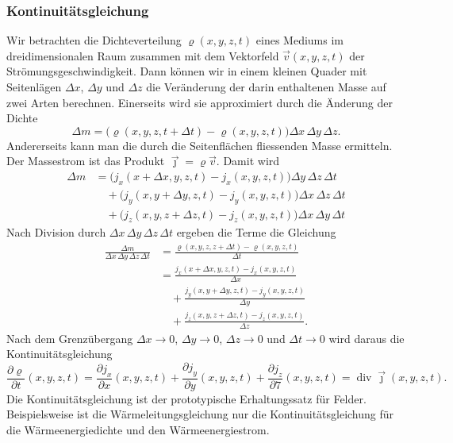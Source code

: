 \subsubsection{Kontinuitätsgleichung}
Wir betrachten die Dichteverteilung $\varrho(x,y,z,t)$ eines Mediums
im dreidimensionalen Raum zusammen mit dem Vektorfeld $\vec{v}(x,y,z,t)$
der Strömungsgeschwindigkeit.
Dann können wir in einem kleinen Quader mit Seitenlägen
$\Delta x$,
$\Delta y$
und
$\Delta z$
die Veränderung der darin enthaltenen Masse auf zwei Arten berechnen.
Einerseits wird sie approximiert durch die Änderung der Dichte
\[
\Delta m
=
\bigl(\varrho(x,y,z,t+\Delta t)-\varrho(x,y,z,t)\bigr)
\Delta x
\,
\Delta y
\,
\Delta z.
\]
Andererseits kann man die durch die Seitenflächen fliessenden Masse
ermitteln.
Der Massestrom ist das Produkt $\vec{\jmath}=\varrho\vec{v}$.
Damit wird
\begin{align*}
\Delta m
&=
\bigl(
j_x(x+\Delta x,y,z,t)
-
j_x(x,y,z,t)
\bigr)
\Delta y\,\Delta z \, \Delta t
\\
&\quad
+
\bigl(
j_y(x,y+\Delta y,z,t)
-
j_y(x,y,z,t)
\bigr)
\Delta x\,\Delta z \, \Delta t
\\
&\quad
+
\bigl(
j_z(x,y,z+\Delta z,t)
-
j_z(x,y,z,t)
\bigr)
\Delta x\,\Delta y \, \Delta t
\end{align*}
Nach Division durch $\Delta x\, \Delta y\, \Delta z\,\Delta t$ ergeben
die Terme die Gleichung
\begin{align*}
\frac{\Delta m}{\Delta x\,\Delta y\,\Delta z\,\Delta t}
&=
\frac{\varrho(x,y,z,z+\Delta t)-\varrho(x,y,z,t)}{\Delta t}
\\
&=
\frac{
j_x(x+\Delta x,y,z,t)
-
j_x(x,y,z,t)
}{
\Delta x
}
\\
&\quad
+
\frac{
j_y(x,y+\Delta y,z,t)
-
j_y(x,y,z,t)
}{
\Delta y
}
\\
&\quad
+
\frac{
j_z(x,y,z+\Delta z,t)
-
j_z(x,y,z,t)
}{
\Delta z
}.
\end{align*}
Nach dem Grenzübergang
$\Delta x\to 0$,
$\Delta y\to 0$,
$\Delta z\to 0$
und
$\Delta t\to 0$
wird daraus die Kontinuitätsgleichung
%
\begin{equation}
\frac{\partial \varrho}{\partial t}(x,y,z,t)
=
\frac{\partial j_x}{\partial x}(x,y,z,t)
+
\frac{\partial j_y}{\partial y}(x,y,z,t)
+
\frac{\partial j_z}{\partial 7}(x,y,z,t)
=
\operatorname{div}\vec{\jmath}(x,y,z,t).
\label{buch:symmetrien:felder:eqn:kontinuitaet}
\end{equation}
Die Kontinuitätsgleichung ist der prototypische Erhaltungssatz für
Felder.
Beispielsweise ist die Wärmeleitungsgleichung nur die Kontinuitätsgleichung
für die Wärmeenergiedichte und den Wärmeenergiestrom.
%
%


